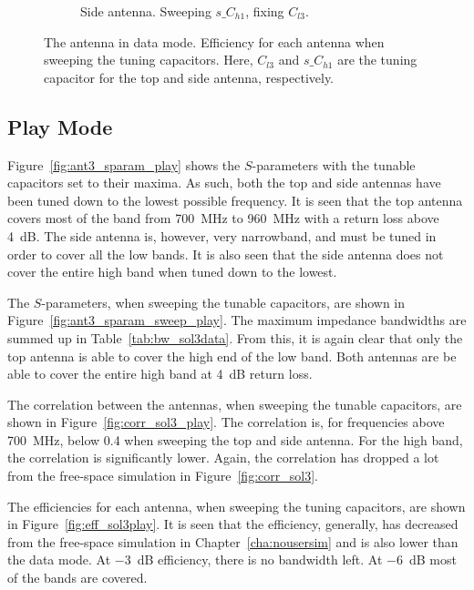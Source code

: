 \begin{figure}[htbp]
\begin{subfigure}{0.49\linewidth}
        \caption{Side antenna. Sweeping $s\_C_{h1}$, fixing $C_{l3}$.}
    \end{subfigure}
    \caption{The antenna in data mode. Efficiency for each antenna when sweeping the tuning capacitors. Here, $C_{l3}$ and $s\_C_{h1}$ are the tuning capacitor for the top and side antenna, respectively.}
    \label{fig:eff_sol3data}
\end{figure}


\FloatBarrier
\subsection{Play Mode}
Figure~\ref{fig:ant3_sparam_play} shows the $S$-parameters with the tunable capacitors set to their maxima. As such, both the top and side antennas have been tuned down to the lowest possible frequency. It is seen that the top antenna covers most of the band from \SI{700}{MHz} to \SI{960}{MHz} with a return loss above \SI{4}{dB}. The side antenna is, however, very narrowband, and must be tuned in order to cover all the low bands. It is also seen that the side antenna does not cover the entire high band when tuned down to the lowest. 

The $S$-parameters, when sweeping the tunable capacitors, are shown in Figure~\ref{fig:ant3_sparam_sweep_play}. The maximum impedance bandwidths are summed up in Table~\ref{tab:bw_sol3data}. From this, it is again clear that only the top antenna is able to cover the high end of the low band. Both antennas are be able to cover the entire high band at \SI{4}{dB} return loss.

The correlation between the antennas, when sweeping the tunable capacitors, are shown in Figure~\ref{fig:corr_sol3_play}. The correlation is, for frequencies above \SI{700}{MHz}, below 0.4 when sweeping the top and side antenna. For the high band, the correlation is significantly lower. Again, the correlation has dropped a lot from the free-space simulation in Figure~\ref{fig:corr_sol3}.

The efficiencies for each antenna, when sweeping the tuning capacitors, are shown in Figure~\ref{fig:eff_sol3play}. It is seen that the efficiency, generally, has decreased from the free-space simulation in Chapter~\ref{cha:nousersim} and is also lower than the data mode. At \SI{-3}{dB} efficiency, there is no bandwidth left. At \SI{-6}{dB} most of the bands are covered.


